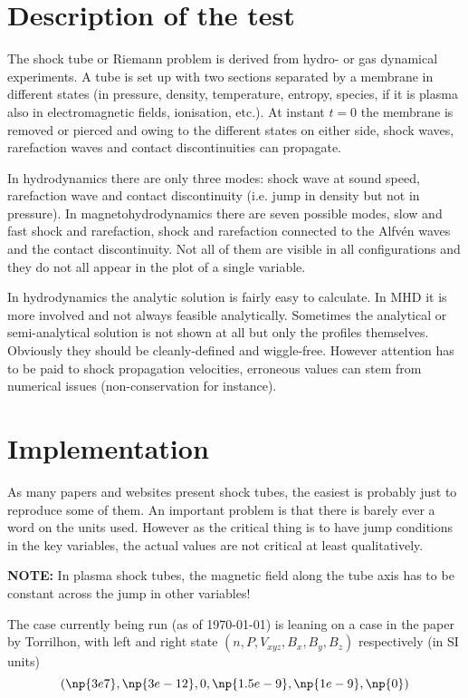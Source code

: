 \documentclass[a4paper,10pt]{scrartcl}
\begin{document}
\section{Description of the test}
The shock tube or Riemann problem is derived from hydro- or gas dynamical experiments. A tube is set up with two sections separated by a membrane in different states (in pressure, density, temperature, entropy, species, if it is plasma also in electromagnetic fields, ionisation, etc.). At instant $t=0$ the membrane is removed or pierced and owing to the different states on either side, shock waves, rarefaction waves and contact discontinuities can propagate.

In hydrodynamics there are only three modes: shock wave at sound speed, rarefaction wave and contact discontinuity (i.e. jump in density but not in pressure). In magnetohydrodynamics there are seven possible modes, slow and fast shock and rarefaction, shock and rarefaction connected to the Alfvén waves and the contact discontinuity. Not all of them are visible in all configurations and they do not all appear in the plot of a single variable.

In hydrodynamics the analytic solution is fairly easy to calculate. In MHD it is more involved and not always feasible analytically. Sometimes the analytical or semi-analytical solution is not shown at all but only the profiles themselves. Obviously they should be cleanly-defined and wiggle-free. However attention has to be paid to shock propagation velocities, erroneous values can stem from numerical issues (non-conservation for instance).


\section{Implementation}
As many papers and websites present shock tubes, the easiest is probably just to reproduce some of them. An important problem is that there is barely ever a word on the units used. However as the critical thing is to have jump conditions in the key variables, the actual values are not critical at least qualitatively.

\textbf{NOTE:} In plasma shock tubes, the magnetic field along the tube axis has to be constant across the jump in other variables!

The case currently being run (as of \today) is leaning on a case in the paper by Torrilhon, with left and right state $\left(n, P, V_{xyz}, B_x, B_y, B_z\right)$ respectively (in SI units)
$$
\left(\np{3e7}, \np{3e-12}, 0, \np{1.5e-9}, \np{1e-9}, \np{0}\right)
$$
\end{document}
